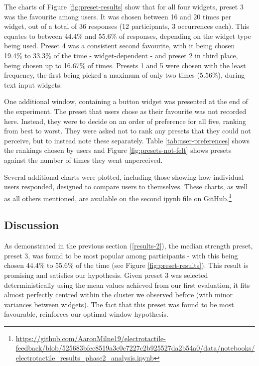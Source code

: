 \documentclass{mpaper}
\begin{document}
The charts of Figure \ref{fig:preset-results} show that for all four widgets, preset 3 was the favourite among users. It was chosen between 16 and 20 times per widget, out of a total of 36 responses (12 participants, 3 occurrences each). This equates to between 44.4\% and 55.6\% of responses, depending on the widget type being used. Preset 4 was a consistent second favourite, with it being chosen 19.4\% to 33.3\% of the time - widget-dependent - and preset 2 in third place, being chosen up to 16.67\% of times. Presets 1 and 5 were chosen with the least frequency, the first being picked a maximum of only two times (5.56\%), during text input widgets.

One additional window, containing a button widget was presented at the end of the experiment. The preset that users chose as their favourite was not recorded here. Instead, they were to decide on an order of preference for all five, ranking from best to worst. They were asked not to rank any presets that they could not perceive, but to instead note these separately. Table \ref{tab:user-preferences} shows the rankings chosen by users and Figure \ref{fig:presets-not-felt} shows presets against the number of times they went unperceived.

Several additional charts were plotted, including those showing how individual users responded, designed to compare users to themselves. These charts, as well as all others mentioned, are available on the second ipynb file on GitHub.\footnote{\url{https://github.com/AaronMilne19/electrotactile-feedback/blob/525683bfec8519a3c0c7227c2b925527da2b54a0/data/notebooks/electrotactile_results_phase2_analysis.ipynb}}\\

\subsection{Discussion}
As demonstrated in the previous section (\ref{results-2}), the median strength preset, preset 3, was found to be most popular among participants - with this being chosen 44.4\% to 55.6\% of the time (see Figure \ref{fig:preset-results}). This result is promising and satisfies our hypothesis. Given preset 3 was selected deterministically using the mean values achieved from our first evaluation, it fits almost perfectly centred within the cluster we observed before (with minor variances between widgets). The fact that this preset was found to be most favourable, reinforces our optimal window hypothesis.
\end{document}
